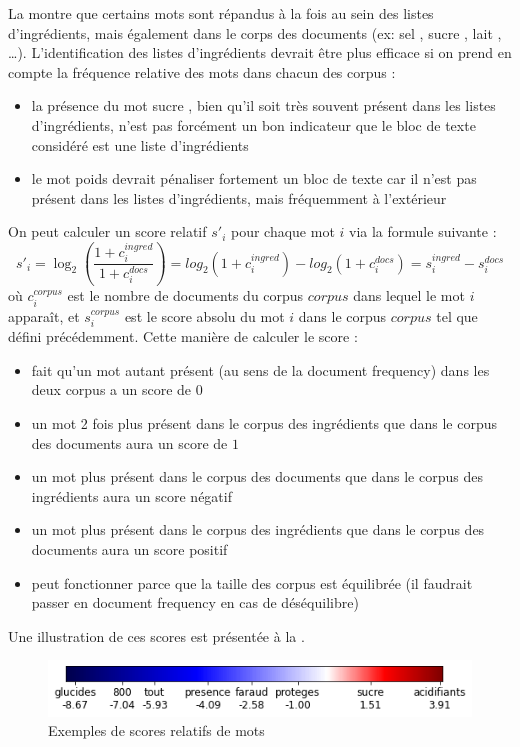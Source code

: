         La  montre que certains mots sont répandus à la fois au sein des listes d'ingrédients, mais également dans le corps des documents (ex: \og sel \fg, \og sucre \fg, \og lait \fg, \dots).
        L'identification des listes d'ingrédients devrait être plus efficace si on prend en compte la fréquence relative des mots dans chacun des corpus : 
        \begin{itemize}
            \item la présence du mot \og sucre \fg, bien qu'il soit très souvent présent dans les listes d'ingrédients, n'est pas forcément un bon indicateur que le bloc de texte considéré est une liste d'ingrédients
            \item le mot \og poids \fg devrait pénaliser fortement un bloc de texte car il n'est pas présent dans les listes d'ingrédients, mais fréquemment à l'extérieur
        \end{itemize}
        On peut calculer un score relatif $s'_{i}$ pour chaque mot $i$ via la formule suivante :
        \[s'_{i} = \log_{2}(\frac{1 + c^{ingred}_{i}}{1 + c^{docs}_{i}}) = log_{2}(1 + c^{ingred}_{i}) - log_{2}(1 + c^{docs}_{i}) = s^{ingred}_{i} - s^{docs}_{i}\]
        où $c^{corpus}_{i}$ est le nombre de documents du corpus $corpus$ dans lequel le mot $i$ apparaît, et $s^{corpus}_{i}$ est le score absolu du mot $i$ dans le corpus $corpus$ tel que défini précédemment.
        Cette manière de calculer le score : 
        \begin{itemize}
            \item fait qu'un mot autant présent (au sens de la document frequency) dans les deux corpus a un score de $0$
            \item un mot 2 fois plus présent dans le corpus des ingrédients que dans le corpus des documents aura un score de $1$
            \item un mot plus présent dans le corpus des documents que dans le corpus des ingrédients aura un score négatif
            \item un mot plus présent dans le corpus des ingrédients que dans le corpus des documents aura un score positif
            \item peut fonctionner parce que la taille des corpus est équilibrée (il faudrait passer en document frequency en cas de déséquilibre)
        \end{itemize}
        Une illustration de ces scores est présentée à la .

        \begin{figure}[htbp]
            \begin{center}
            \includegraphics[width=0.6\linewidth]{img/relative_score_bar.png}
            \end{center}
            \caption{Exemples de scores relatifs de mots}
            \label{fig:relative_score_bar}
        \end{figure} 



